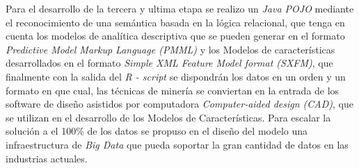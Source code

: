  Para el desarrollo de la tercera y ultima etapa se realizo un \textit{Java POJO} mediante el reconocimiento de una semántica basada en la lógica relacional, que tenga en cuenta los modelos de analítica descriptiva que se pueden generar en el formato \textit{Predictive Model Markup Language (PMML)} y los Modelos de características desarrollados en el formato \textit{ Simple XML Feature Model format (SXFM)}, que finalmente con la salida del \textit{R - script} se dispondrán los datos en un orden y un formato en que cual, las técnicas de minería se conviertan en la entrada de los software de diseño asistidos por computadora \textit{Computer-aided design (CAD)}, que se utilizan en el desarrollo de los Modelos de Características. Para escalar la solución a el 100\% de los datos se propuso en el diseño del modelo una infraestructura de \textit{Big Data} que pueda soportar la gran cantidad de datos en las industrias actuales.
